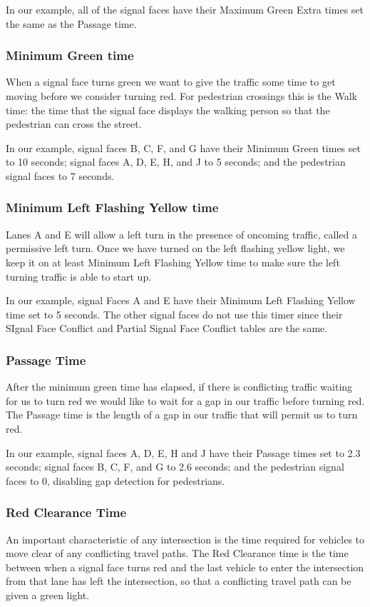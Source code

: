 \documentclass[letterpaper,twoside]{article}
\begin{document}
In our example, all of the signal faces have their Maximum Green Extra times
set the same as the Passage time.

\subsubsection{Minimum Green time}
When a signal face turns green we want to give the traffic some time
to get moving before we consider turning red.  For pedestrian crossings
this is the Walk time: the time that the signal face displays the walking
person so that the pedestrian can cross the street.

In our example, signal faces B, C, F, and G have their Minimum Green
times set to 10 seconds; signal faces A, D, E, H, and J to 5 seconds;
and the pedestrian signal faces to 7 seconds.

\subsubsection{Minimum Left Flashing Yellow time}
Lanes A and E will allow a left turn in the presence of oncoming traffic,
called a permissive left turn.  Once we have turned on the left flashing
yellow light, we keep it on at least Minimum Left Flashing Yellow time
to make sure the left turning traffic is able to start up.

In our example, signal Faces A and E have their Minimum Left Flashing Yellow
time set to 5 seconds.  The other signal faces do not use this timer
since their SIgnal Face Conflict and Partial Signal Face Conflict
tables are the same.

\subsubsection{Passage Time}
After the minimum green time has elapsed, if there is conflicting traffic
waiting for us to turn red we would like to wait for a gap in our traffic
before turning red.
The Passage time is the length of a gap in our traffic that will permit us
to turn red.

In our example, signal faces A, D, E, H and J have their Passage times
set to 2.3 seconds; signal faces B, C, F, and G to 2.6 seconds; and
the pedestrian signal faces to 0, disabling gap detection
for pedestrians.

\subsubsection{Red Clearance Time}
An important characteristic of any intersection is the time required
for vehicles to move clear of any conflicting travel paths.
The Red Clearance time is the time between when a signal face turns red
and the last vehicle to enter the intersection from that lane has left the
intersection, so that a conflicting travel path can be given a green light.
\end{document}
